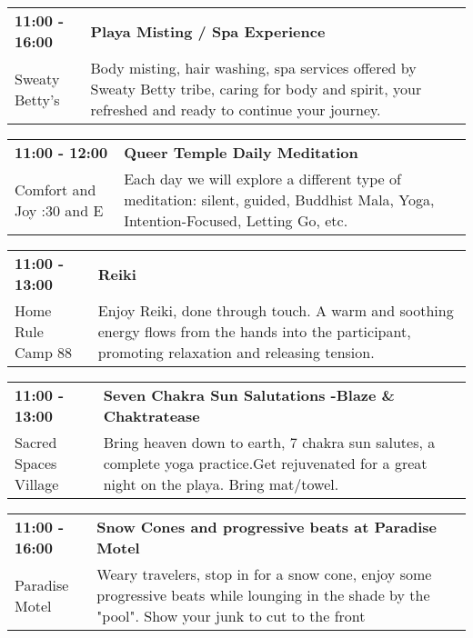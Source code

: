 \begin{tabular}{ p{1in} p{2.2in} }
    \textbf{11:00 - 16:00} & \textbf{Playa Misting / Spa Experience} \\
    Sweaty  Betty's \newline  & Body misting, hair washing, spa services offered by Sweaty Betty tribe, caring for body and spirit, your refreshed and ready to continue your journey. \\
    \hline 
\end{tabular}
    
\begin{tabular}{ p{1in} p{2.2in} }
    \textbf{11:00 - 12:00} & \textbf{Queer Temple Daily Meditation} \\
    Comfort and Joy \newline 7:30 and E & Each day we will explore a different type of meditation: silent, guided, Buddhist Mala, Yoga, Intention-Focused, Letting Go, etc. \\
    \hline 
\end{tabular}
    
\begin{tabular}{ p{1in} p{2.2in} }
    \textbf{11:00 - 13:00} & \textbf{Reiki } \\
    Home Rule \newline Camp 88 & Enjoy Reiki, done through touch. A warm and soothing energy flows from the hands into the participant, promoting relaxation and releasing tension. \\
    \hline 
\end{tabular}
    
\begin{tabular}{ p{1in} p{2.2in} }
    \textbf{11:00 - 13:00} & \textbf{Seven Chakra Sun Salutations -Blaze \& Chaktratease} \\
    Sacred Spaces Village \newline  & Bring heaven down to earth, 7 chakra sun salutes, a complete yoga practice.Get rejuvenated for a great night on the playa. Bring mat/towel. \\
    \hline 
\end{tabular}
    
\begin{tabular}{ p{1in} p{2.2in} }
    \textbf{11:00 - 16:00} & \textbf{Snow Cones and progressive beats at Paradise Motel} \\
    Paradise Motel \newline  & Weary travelers, stop in for a snow cone, enjoy some progressive beats while lounging in the shade by the "pool".   Show your junk to cut to the front \\
    \hline 
\end{tabular}
    

